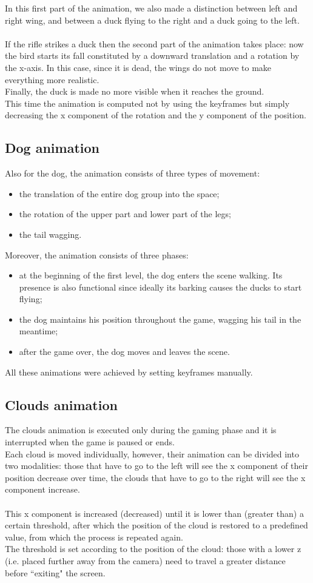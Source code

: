 \documentclass[12pt,a4paper]{article}
\begin{document}
	In this first part of the animation, we also made a distinction between left and right wing, and between a duck flying to the right and a duck going to the left.\\
	\\
	If the rifle strikes a duck then the second part of the animation takes place: now the bird starts its fall constituted by a downward translation and a rotation by the x-axis. In this case, since it is dead, the wings do not move to make everything more realistic.\\
	Finally, the duck is made no more visible when it reaches the ground.\\ 
	This time the animation is computed not by using the keyframes but simply decreasing the x component of the rotation and the y component of the position. 
	\subsection{Dog animation}
	Also for the dog, the animation consists of three types of movement:
	\begin{itemize}
		\item the translation of the entire dog group into the space;
		\item the rotation of the upper part and lower part of the legs;
		\item the tail wagging.
	\end{itemize}
	Moreover, the animation consists of three phases:
	\begin{itemize}
		\item at the beginning of the first level, the dog enters the scene walking. Its presence is also functional since ideally its barking causes the ducks to start flying;
		\item the dog maintains his position throughout the game, wagging his tail in the meantime;
		\item after the game over, the dog moves and leaves the scene.
	\end{itemize}
	All these animations were achieved by setting keyframes manually. 
	
	\subsection{Clouds animation}
	The clouds animation is executed only during the gaming phase and it is interrupted when the game is paused or ends.\\
	Each cloud is moved individually, however, their animation can be divided into two modalities: those that have to go to the left will see the x component of their position decrease over time, the clouds that have to go to the right will see the x component increase.\\\\
	This x component is increased (decreased) until it is lower than (greater than) a certain threshold, after which the position of the cloud is restored to a predefined value, from which the process is repeated again.\\
	The threshold is set according to the position of the cloud: those with a lower z (i.e. placed further away from the camera) need to travel a greater distance before ``exiting" the screen.
	
\end{document}
